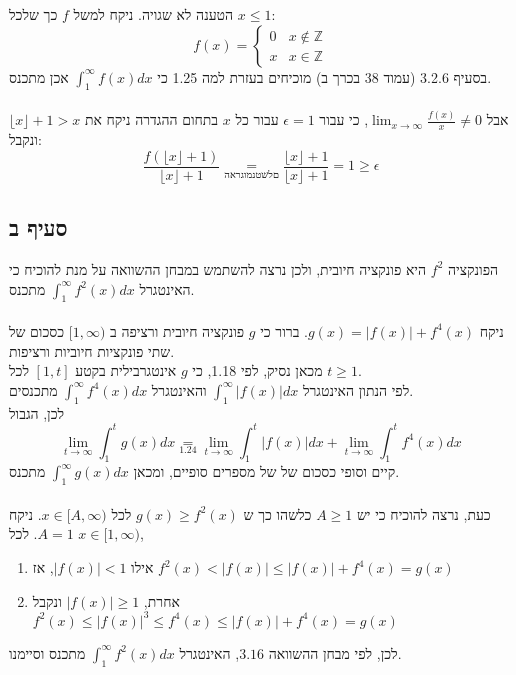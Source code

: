 \documentclass{article}
\newcommand\underrel[2]{\mathrel{\mathop{#2}\limits_{#1}}}
\begin{document}
הטענה לא שגויה. ניקח למשל $f$ כך שלכל $x\leq 1$:
\[
    f(x) = \begin{cases}
        0 & x\notin \mathbb{Z} \\
        x & x\in \mathbb{Z}
    \end{cases}
\]
בסעיף 3.2.6 (עמוד 38 בכרך ב)
מוכיחים בעזרת למה 1.25 כי $\int_1^\infty f(x)dx$
אכן מתכנס.
\\\\
אבל $\lim_{x\rightarrow\infty}\frac{f(x)}{x}\ne 0$,
כי עבור $\epsilon=1$ עבור כל $x$ בתחום ההגדרה ניקח את $\lfloor x \rfloor + 1 > x$ ונקבל:
\[
    \frac{f(\lfloor x \rfloor + 1)}{\lfloor x \rfloor + 1} \underrel{הארגומנט שלם}{=}
    \frac{\lfloor x \rfloor + 1}{\lfloor x \rfloor + 1} =
    1 \geq \epsilon
\]

\subsection*{סעיף ב}

הפונקציה $f^2$
היא פונקציה חיובית, ולכן נרצה להשתמש במבחן ההשוואה על מנת להוכיח כי
האינטגרל $\int_1^\infty f^2(x)dx$
מתכנס.
\\\\
ניקח $g(x)=|f(x)|+f^4(x)$.
ברור כי $g$ פונקציה חיובית ורציפה ב $[1,\infty)$ כסכום של שתי פונקציות חיוביות ורציפות. \\
מכאן נסיק, לפי 1.18, כי $g$ אינטגרבילית בקטע $[1,t]$ לכל $t\geq 1$. \\
לפי הנתון האינטגרל $\int_1^\infty |f(x)|dx$
והאינטגרל $\int_1^\infty f^4(x)dx$ מתכנסים.\\
לכן, הגבול
\[
    \lim_{t\rightarrow \infty}\int_1^t g(x)dx \underrel{1.24}{=}
    \lim_{t\rightarrow \infty}\int_1^t |f(x)|dx + \lim_{t\rightarrow \infty}\int_1^t f^4(x)dx
\]
קיים וסופי כסכום של של מספרים סופיים, ומכאן $\int_1^\infty g(x)dx$ מתכנס.
\\\\
כעת, נרצה להוכיח כי יש $A\geq 1$
כלשהו כך ש $g(x)\geq f^2(x)$
לכל $x\in[A,\infty)$.
ניקח $A=1$. לכל $x\in[1,\infty)$,

\begin{enumerate}[I]
    \item אילו $|f(x)|<1$,
          אז $f^2(x)<|f(x)|\leq |f(x)|+f^4(x)=g(x)$
    \item אחרת, $|f(x)|\geq 1$
          ונקבל $f^2(x)\leq|f(x)|^3\leq f^4(x)\leq |f(x)|+f^4(x)=g(x)$
\end{enumerate}
לכן, לפי מבחן ההשוואה $3.16$,
האינטגרל $\int_1^\infty f^2(x)dx$
מתכנס וסיימנו.
\end{document}
